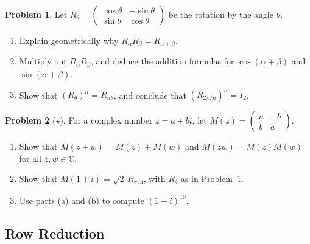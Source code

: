 \documentclass[11pt]{article}
\theoremstyle{definition}
\newtheorem{problem}{Problem}[section]
\begin{document}
\begin{problem}\label{pr:rotation-addition}
    Let $R_\theta = \begin{pmatrix} \cos\theta & -\sin\theta \\ \sin\theta & \cos\theta \end{pmatrix}$ be the rotation by the angle $\theta$.
    \begin{enumerate}[label=(\alph*)]
        \item Explain geometrically why $R_\alpha R_\beta = R_{\alpha + \beta}$.
        \item Multiply out $R_\alpha R_\beta$, and deduce the addition formulas for $\cos(\alpha + \beta)$ and $\sin(\alpha + \beta)$.
        \item Show that $(R_\theta)^n = R_{n\theta}$, and conclude that $(R_{2\pi/n})^n = I_2$.
    \end{enumerate}
\end{problem}

\begin{problem}[$\star$]\label{pr:complex-matrix}
    For a complex number $z = a + bi$, let $M(z) = \begin{pmatrix} a & -b \\ b & a \end{pmatrix}$.
    \begin{enumerate}[label=(\alph*)]
        \item Show that $M(z + w) = M(z) + M(w)$ and $M(zw) = M(z) M(w)$ for all $z, w \in \mathbb{C}$.
        \item Show that $M(1 + i) = \sqrt{2}\, R_{\pi/4}$, with $R_\theta$ as in Problem~\ref{pr:rotation-addition}.
        \item Use parts (a) and (b) to compute $(1 + i)^{10}$.
    \end{enumerate}
\end{problem}

\subsection{Row Reduction}
\end{document}
